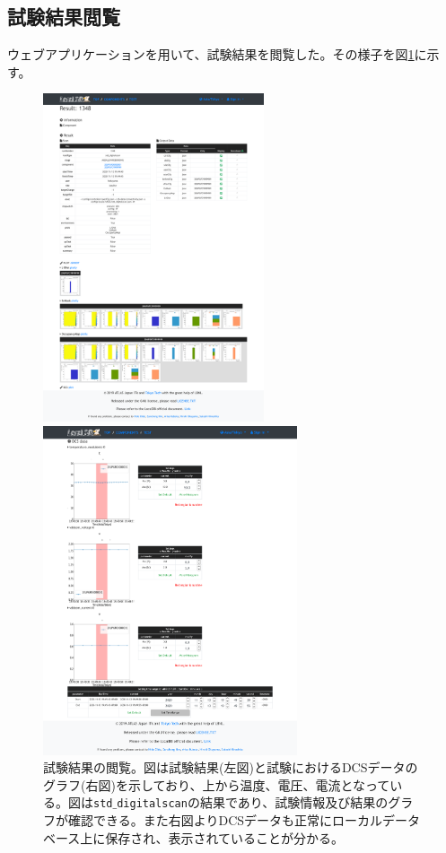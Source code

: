 \clearpage
\subsection{試験結果閲覧}
ウェブアプリケーションを用いて、試験結果を閲覧した。その様子を図\ref{demo_view_result}に示す。
\begin{figure}[bpt]\centering
  \begin{minipage}{0.45\hsize}
    \begin{center}
    \includegraphics[width=65mm]{demo_view_scan_result.pdf}
    \end{center}
  \end{minipage}
  \begin{minipage}{0.45\hsize}
    \begin{center}
    \includegraphics[width=75mm]{demo_view_dcs.pdf}
    \end{center}
  \end{minipage}
  \caption[試験結果の閲覧]{試験結果の閲覧。図は試験結果(左図)と試験におけるDCSデータのグラフ(右図)を示しており、上から温度、電圧、電流となっている。図は\texttt{std$\_$digitalscan}の結果であり、試験情報及び結果のグラフが確認できる。また右図よりDCSデータも正常にローカルデータベース上に保存され、表示されていることが分かる。}
  \label{demo_view_result}
\end{figure}


